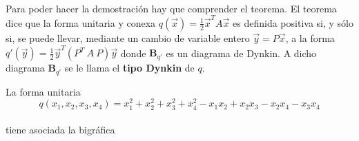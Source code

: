 \paragraph{}
Para poder hacer la demostración hay que comprender el teorema. El teorema dice que la forma unitaria y conexa $q(\overrightarrow{x}) = \frac{1}{2}\overrightarrow{x}^{T}A\overrightarrow{x}$ es definida positiva si, y sólo si, se puede llevar, mediante un cambio de variable entero $\overrightarrow{y} = P\overrightarrow{x}$, a la forma $q'(\overrightarrow{y}) = \frac{1}{2}\overrightarrow{y}^{T}\left(P^{T}~A~P\right)\overrightarrow{y}$ donde $\textbf{B}_{q'}$ es un diagrama de Dynkin. A dicho diagrama $\textbf{B}_{q'}$ se le llama el \textbf{tipo Dynkin} de $q$.
\begin{example}\citep{AbarcaSoteloMarioAlberto2011Apds}
La forma unitaria
\begin{equation}
    q(x_{1}, x_{2}, x_{3}, x_{4}) = x^{2}_{1} + x^{2}_{2} + x^{2}_{3} + x^{2}_{4} - x_{1}x_{2} + x_{2}x_{3} - x_{2}x_{4} - x_{3}x_{4}
    \label{ecuacion:1.5}
\end{equation}\\
tiene asociada la bigráfica
\begin{center}
\end{center}


\end{example}
